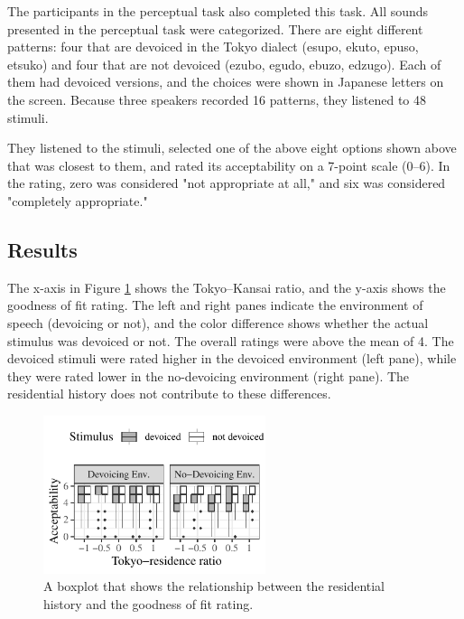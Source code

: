 \documentclass[a4paper,11pt,twocolumn]{article}
\begin{document}
The participants in the perceptual task also completed this task. All sounds presented in the perceptual task were categorized. There are eight different patterns: four that are devoiced in the Tokyo dialect (esupo, ekuto, epuso, etsuko) and four that are not devoiced (ezubo, egudo, ebuzo, edzugo). Each of them had devoiced versions, and the choices were shown in Japanese letters on the screen. Because three speakers recorded 16 patterns, they listened to 48 stimuli.

They listened to the stimuli, selected one of the above eight options shown above that was closest to them, and rated its acceptability on a 7-point scale (0--6). In the rating, zero was considered "not appropriate at all," and six was considered "completely appropriate."

\subsection{Results}

The x-axis in Figure \ref{fig:cat_results} shows the Tokyo--Kansai ratio, and the y-axis shows the goodness of fit rating. The left and right panes indicate the environment of speech (devoicing or not), and the color difference shows whether the actual stimulus was devoiced or not. The overall ratings were above the mean of 4. The devoiced stimuli were rated higher in the devoiced environment (left pane), while they were rated lower in the no-devoicing environment (right pane). The residential history does not contribute to these differences.
\begin{figure}[!ht]
\begin{center}
\includegraphics[width=6.5cm]{../results/artifact/results_categorization.pdf}
\caption{A boxplot that shows the relationship between the residential history and the goodness of fit rating.}\label{fig:cat_results}
\end{center}
\end{figure}
\end{document}
